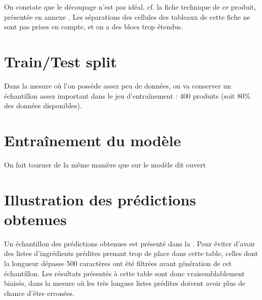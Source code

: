         \begin{multicols}{3}
        \begin{spacing}{1.0}
        {\tiny
        
        }
        \end{spacing}
        \end{multicols}

        On constate que le découpage n'est pas idéal, cf. la fiche technique de ce produit, présentée en annexe .
        Les séparations des cellules des tableaux de cette fiche ne sont pas prises en compte, et on a des blocs trop étendus.

        \section{Train/Test split}

        Dans la mesure où l'on possède assez peu de données, on va conserver un échantillon assez important dans le jeu d'entraînement : 400 produits (soit 80\% des données disponibles).

        \section{Entraînement du modèle}

        On fait tourner de la même manière que sur le modèle dit \og ouvert \fg

        \section{Illustration des prédictions obtenues}

        Un échantillon des prédictions obtenues est présenté dans la .
        Pour éviter d'avoir des listes d'ingrédients prédites prenant trop de place dans cette table, celles dont la longueur dépasse 500 caractères ont été filtrées avant génération de cet échantillon.
        Les résultats présentés à cette table sont donc vraisemblablement biaisés, dans la mesure où les très longues listes prédites doivent avoir plus de chance d'être erronées.

